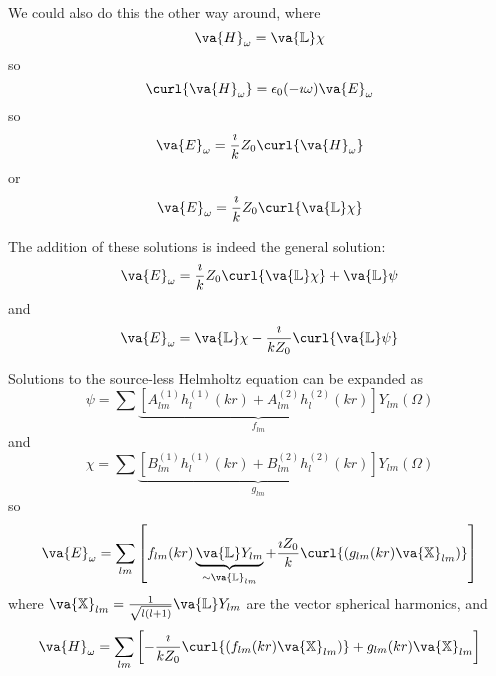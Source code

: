 \documentclass[a4paper,twoside,master.tex]{subfiles}
\begin{document}
We could also do this the other way around, where
\begin{equation}
    \va{H}_{\omega} = \va{\mathbb{L}} \chi
\end{equation}
so
\begin{equation}
    \curl{ \va{H}_{\omega}} = \epsilon_0 (- \imath \omega) \va{E}_{\omega}
\end{equation}
so
\begin{equation}
    \va{E}_{\omega} = \frac{\imath}{k} Z_0 \curl{ \va{H}_{\omega}}
\end{equation}
or
\begin{equation}
    \va{E}_{\omega} = \frac{\imath}{k} Z_0 \curl{ \va{\mathbb{L}} \chi}
\end{equation}

The addition of these solutions is indeed the general solution:
\begin{equation}
    \va{E}_{\omega} = \frac{\imath}{k} Z_0 \curl{ \va{\mathbb{L}} \chi} + \va{\mathbb{L}} \psi
\end{equation}
and
\begin{equation}
    \va{E}_{\omega} = \va{\mathbb{L}} \chi - \frac{\imath}{kZ_0} \curl{ \va{\mathbb{L}} \psi}
\end{equation}

Solutions to the source-less Helmholtz equation can be expanded as
\begin{equation}
    \psi = \sum \underbrace{\left[ A_{lm}^{(1)} h_{l}^{(1)}(kr) + A_{lm}^{(2)} h_l^{(2)}(kr) \right]}_{f_{lm}} Y_{lm}(\Omega)
\end{equation}
and
\begin{equation}
    \chi = \sum \underbrace{\left[ B_{lm}^{(1)} h_{l}^{(1)}(kr) + B_{lm}^{(2)} h_l^{(2)}(kr) \right]}_{g_{lm}} Y_{lm}(\Omega)
\end{equation}
so
\begin{equation}
    \va{E}_{\omega} = \sum_{lm} \left[ f_{lm}(kr) \underbrace{\va{\mathbb{L}} Y_{lm}}_{\sim \va{\mathbb{L}}_{lm}} + \frac{\imath Z_0}{k} \curl{(g_{lm}(kr) \va{\mathbb{X}}_{lm})} \right]
\end{equation}
where $ \va{\mathbb{X}}_{lm} = \frac{1}{\sqrt{l(l+1)}} \va{\mathbb{L}} Y_{lm} $ are the vector spherical harmonics, and
\begin{equation}
    \va{H}_{\omega} = \sum_{lm} \left[ - \frac{\imath}{k Z_0} \curl{(f_{lm}(kr) \va{\mathbb{X}}_{lm})} + g_{lm}(kr) \va{\mathbb{X}}_{lm} \right]
\end{equation}
\end{document}
